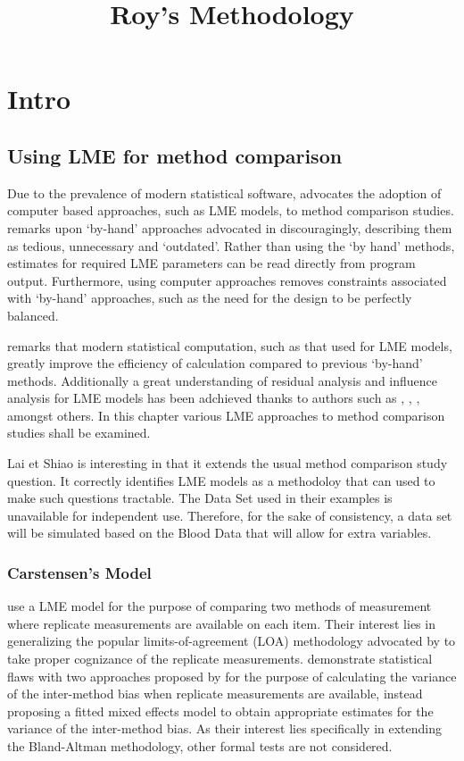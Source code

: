 \documentclass[12pt, a4paper]{report}
\title{Roy's Methodology}
\author{ } \date{ }
\theoremstyle{plain}
\theoremstyle{definition}
\theoremstyle{remark}
\begin{document}
	\tableofcontents
	\newpage
\chapter{Intro}
\section{Using LME for method comparison}
Due to the prevalence of modern statistical software, \citet{BXC2008} advocates the adoption of computer based approaches, such as LME models, to method comparison studies. \citet{BXC2008} remarks upon `by-hand' approaches advocated in \citet{BA99} discouragingly, describing them as tedious, unnecessary and `outdated'. Rather than using the `by hand' methods, estimates for required LME parameters can be read directly from program output. Furthermore, using computer approaches removes constraints associated with `by-hand' approaches, such as the need for the design to be perfectly balanced.

\citet{BXC2008} remarks that modern statistical computation, such as that used for LME models, greatly improve the efficiency of
calculation compared to previous `by-hand' methods. Additionally a great understanding of residual analysis and influence analysis for LME models has been adchieved thanks to authors such as \citet{schab}, \citet{CPJ}, \citet{cook86} \citet{west}, amongst others. In this chapter various LME approaches to method comparison studies shall
be examined.

Lai et Shiao is interesting in that it extends the usual method comparison study question. It correctly identifies LME models as a methodoloy that can used to make such questions tractable.
The Data Set used in their examples is unavailable for independent use. Therefore, for the sake of consistency, a data set will be simulated based on the Blood Data that will allow for extra variables.
\newpage
\subsection{Carstensen's Model}

\citet{BXC2008} use a LME model for the purpose of comparing two methods of measurement where replicate measurements are available on each item. Their interest lies in generalizing the popular limits-of-agreement (LOA) methodology advocated by \citet{BA86} to take proper cognizance of the replicate measurements. \citet{BXC2008} demonstrate statistical flaws with two approaches proposed by \citet{BA99} for the purpose of calculating the variance of the inter-method bias when replicate measurements are available, instead proposing a fitted mixed effects model to obtain appropriate estimates for the variance of the inter-method bias.  As their interest lies specifically in extending the Bland-Altman methodology, other formal tests are not considered.
\end{document}
